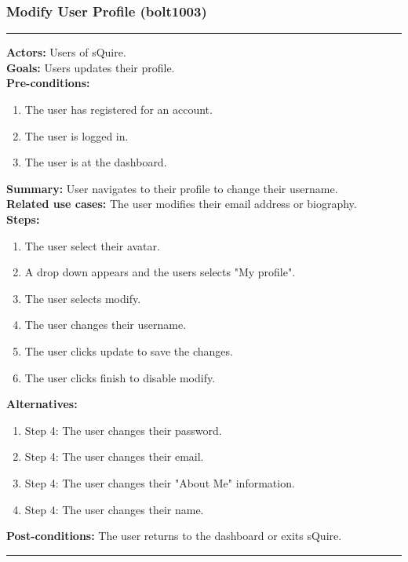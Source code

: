\documentclass[11pt]{report}
\begin{document}
\subsubsection{Modify User Profile (bolt1003)}
\vspace{2pt}
\hrule
\vspace{8pt}
 \textbf{Actors:} Users of sQuire. \\ 
 \textbf{Goals:} Users updates their profile. \\
 \textbf{Pre-conditions:} \begin{enumerate}
  \item The user has registered for an account.
  \item The user is logged in.
  \item The user is at the dashboard.
 \end{enumerate}
 \textbf{Summary:} User navigates to their profile to change their username.\\ 
 \textbf{Related use cases:} The user modifies their email address or biography. \\ 
 \textbf{Steps:} \begin{enumerate}
  \item The user select their avatar.
  \item A drop down appears and the users selects "My profile".
  \item The user selects modify. 
  \item The user changes their username.
  \item The user clicks update to save the changes.
  \item The user clicks finish to disable modify.
 \end{enumerate}
 \textbf{Alternatives:} \begin{enumerate} 
  \item Step 4: The user changes their password.
  \item Step 4: The user changes their email.
  \item Step 4: The user changes their "About Me" information.
  \item Step 4: The user changes their name.
 \end{enumerate}
 \textbf{Post-conditions:} The user returns to the dashboard or exits sQuire. \\
 \vspace{8pt}
\hrule
\newpage
\end{document}
